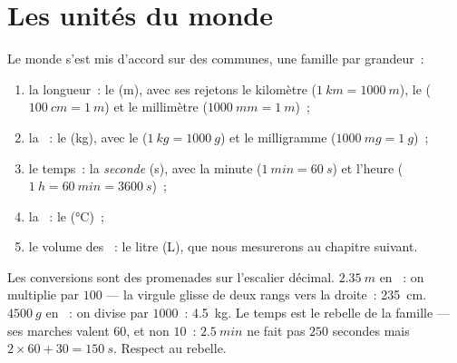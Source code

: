 \section{Les unités du monde}

\begin{definition}\label{def:g6:measurement-in-science:units}
Le monde s'est mis d'accord sur des  communes, une famille par
grandeur~:
\begin{enumerate}
  \item la longueur~: le \emph{} (\unit{m}), avec ses rejetons
        le kilomètre ($\qty{1}{km} = \qty{1000}{m}$), le 
        ($\qty{100}{cm} = \qty{1}{m}$) et le millimètre
        ($\qty{1000}{mm} = \qty{1}{m}$)~;
  \item la ~: le \emph{} (\unit{kg}), avec le 
        ($\qty{1}{kg} = \qty{1000}{g}$) et le milligramme
        ($\qty{1000}{mg} = \qty{1}{g}$)~;
  \item le temps~: la \emph{seconde} (\unit{s}), avec la minute
        ($\qty{1}{min} = \qty{60}{s}$) et l'heure
        ($\qty{1}{h} = \qty{60}{min} = \qty{3600}{s}$)~;
  \item la ~: le  (\unit{\celsius})~;
  \item le volume des ~: le litre (\unit{L}), que nous
        mesurerons au chapitre suivant.
\end{enumerate}
\end{definition}

\begin{example}\label{ex:g6:measurement-in-science:convert}
Les conversions sont des promenades sur l'escalier décimal.
$\qty{2.35}{m}$ en ~: on multiplie par $100$ --- la
virgule glisse de deux rangs vers la droite~: \qty{235}{cm}.
$\qty{4500}{g}$ en ~: on divise par $1000$~:
\qty{4.5}{kg}. Le temps est le rebelle de la famille --- ses marches
valent $60$, et non $10$~: $\qty{2.5}{min}$ ne fait pas $250$
secondes mais $2 \times 60 + 30 = \qty{150}{s}$. Respect au rebelle.
\end{example}

